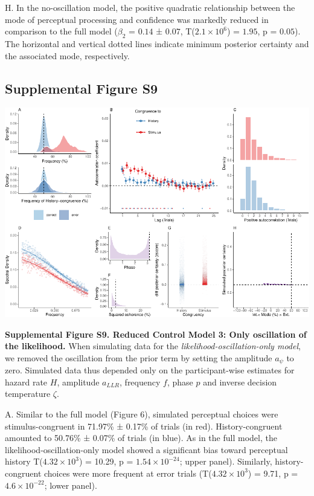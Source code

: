 \documentclass[
]{article}
\begin{document}
H. In the no-oscillation model, the positive quadratic relationship
between the mode of perceptual processing and confidence was markedly
reduced in comparison to the full model (\(\beta_2\) = \(0.14\) ±
\(0.07\), T(\(\ensuremath{2.1\times 10^{6}}\)) = \(1.95\), p =
\(0.05\)). The horizontal and vertical dotted lines indicate minimum
posterior certainty and the associated mode, respectively.

\newpage

\hypertarget{supplemental-figure-s9}{%
\subsection{Supplemental Figure S9}\label{supplemental-figure-s9}}

\includegraphics{modes_mouse_files/figure-latex/Supplemental_Figure_S9-1.pdf}

\textbf{Supplemental Figure S9. Reduced Control Model 3: Only
oscillation of the likelihood.} When simulating data for the
\emph{likelihood-oscillation-only model}, we removed the oscillation
from the prior term by setting the amplitude \(a_{\psi}\) to zero.
Simulated data thus depended only on the participant-wise estimates for
hazard rate \(H\), amplitude \(a_{LLR}\), frequency \(f\), phase \(p\)
and inverse decision temperature \(\zeta\).

A. Similar to the full model (Figure 6), simulated perceptual choices
were stimulus-congruent in 71.97\% ± 0.17\% of trials (in red).
History-congruent amounted to 50.76\% ± 0.07\% of trials (in blue). As
in the full model, the likelihood-oscillation-only model showed a
significant bias toward perceptual history
T(\ensuremath{4.32\times 10^{3}}) = 10.29, p =
\(\ensuremath{1.54\times 10^{-24}}\); upper panel). Similarly,
history-congruent choices were more frequent at error trials
(T(\ensuremath{4.32\times 10^{3}}) = 9.71, p =
\(\ensuremath{4.6\times 10^{-22}}\); lower panel).
\end{document}

